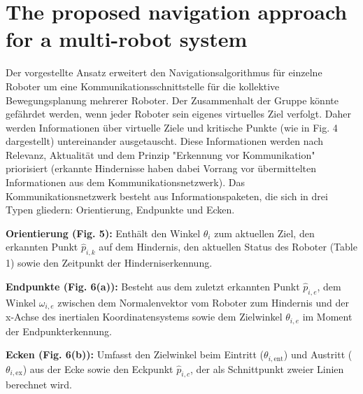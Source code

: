 \documentclass[conference]{IEEEtran}
\begin{document}
\section{The proposed navigation approach for a multi-robot system}
Der vorgestellte Ansatz erweitert den Navigationsalgorithmus für einzelne Roboter 
um eine Kommunikationsschnittstelle für die kollektive Bewegungsplanung mehrerer 
Roboter. Der Zusammenhalt der Gruppe könnte gefährdet werden, wenn jeder Roboter 
sein eigenes virtuelles Ziel verfolgt. Daher werden Informationen über virtuelle 
Ziele und kritische Punkte (wie in Fig. 4 dargestellt) untereinander ausgetauscht. 
Diese Informationen werden nach Relevanz, Aktualität und dem Prinzip "Erkennung vor 
Kommunikation" priorisiert (erkannte Hindernisse haben dabei Vorrang vor übermittelten 
Informationen aus dem Kommunikationsnetzwerk).
Das Kommunikationsnetzwerk besteht aus Informationspaketen, die sich in drei Typen 
gliedern: Orientierung, Endpunkte und Ecken.

\textbf{Orientierung (Fig. 5):} Enthält den Winkel \( \theta_i \) zum aktuellen Ziel, den erkannten 
Punkt \( \hat{p}_{i,k} \) auf dem Hindernis, den aktuellen Status des Roboter (Table 1) sowie den 
Zeitpunkt der Hinderniserkennung.

\textbf{Endpunkte (Fig. 6(a)):} Besteht aus dem zuletzt erkannten Punkt \( \hat{p}_{i,e} \), dem Winkel \( \omega_{i,e} \) 
zwischen dem Normalenvektor vom Roboter zum Hindernis und der x-Achse des inertialen 
Koordinatensystems sowie dem Zielwinkel \( \theta_{i,e} \) im Moment der Endpunkterkennung.

\textbf{Ecken (Fig. 6(b)):} Umfasst den Zielwinkel beim Eintritt (\( \theta_{i,\mathrm{ent}} \)) und Austritt 
(\( \theta_{i,\mathrm{ex}} \)) aus der Ecke sowie den Eckpunkt \( \hat{p}_{i,c} \), der als Schnittpunkt zweier 
Linien berechnet wird.
\end{document}
